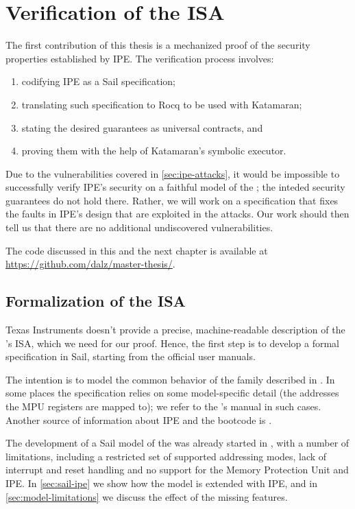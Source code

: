 \chapter{Verification of the \texorpdfstring{\msp}{MSP430} ISA}
\label{ch:contracts}

The first contribution of this thesis is a mechanized proof of the security properties established by IPE. The verification process involves:
\begin{enumerate}
\item codifying IPE as a Sail specification;
\item translating such specification to Rocq to be used with Katamaran;
\item stating the desired guarantees as universal contracts, and
\item proving them with the help of Katamaran's symbolic executor.
\end{enumerate}

Due to the vulnerabilities covered in \cref{sec:ipe-attacks}, it would be impossible to successfully verify IPE's security on a faithful model of the \msp; the inteded security guarantees do not hold there. Rather, we will work on a specification that fixes the faults in IPE's design that are exploited in the attacks. Our work should then tell us that there are no additional undiscovered vulnerabilities.

The code discussed in this and the next chapter is available at \url{https://github.com/dalz/master-thesis/}.

\section{Formalization of the \texorpdfstring{\msp}{MSP430} ISA}

Texas Instruments doesn't provide a precise, machine-readable description of the \msp's ISA, which we need for our proof. Hence, the first step is to develop a formal specification in Sail, starting from the official user manuals.

The intention is to model the common behavior of the family described in \cite{slau367p}. In some places the specification relies on some model-specific detail (\eg the addresses the MPU registers are mapped to); we refer to the \msp[FR5969]'s manual \cite{slas704g} in such cases. Another source of information about IPE and the bootcode is \cite{slaa685}.

The development of a Sail model of the \msp was already started in \cite{mspthesis}, with a number of limitations, including a restricted set of supported addressing modes, lack of interrupt and reset handling and no support for the Memory Protection Unit and IPE. In \cref{sec:sail-ipe} we show how the model is extended with IPE, and in \cref{sec:model-limitations} we discuss the effect of the missing features.

